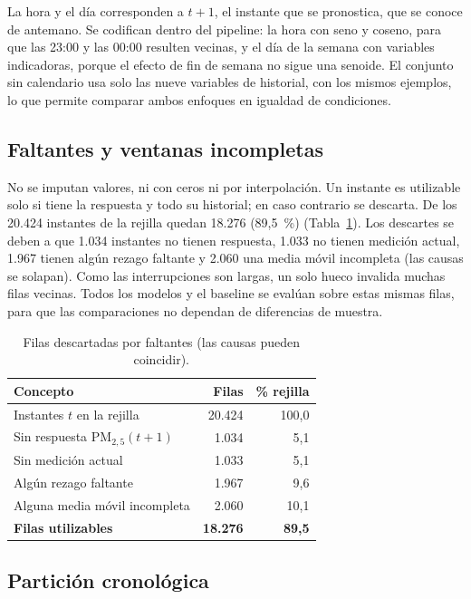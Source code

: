 La hora y el día corresponden a $t+1$, el instante que se pronostica, que se conoce de antemano. Se codifican dentro del pipeline: la hora con seno y coseno, para que las 23:00 y las 00:00 resulten vecinas, y el día de la semana con variables indicadoras, porque el efecto de fin de semana no sigue una senoide. El conjunto sin calendario usa solo las nueve variables de historial, con los mismos ejemplos, lo que permite comparar ambos enfoques en igualdad de condiciones.

\subsection{Faltantes y ventanas incompletas}

No se imputan valores, ni con ceros ni por interpolación. Un instante es utilizable solo si tiene la respuesta y todo su historial; en caso contrario se descarta. De los 20.424 instantes de la rejilla quedan 18.276 (89,5~\%) (Tabla~\ref{tab:perdida}). Los descartes se deben a que 1.034 instantes no tienen respuesta, 1.033 no tienen medición actual, 1.967 tienen algún rezago faltante y 2.060 una media móvil incompleta (las causas se solapan). Como las interrupciones son largas, un solo hueco invalida muchas filas vecinas. Todos los modelos y el baseline se evalúan sobre estas mismas filas, para que las comparaciones no dependan de diferencias de muestra.

\begin{table}[t]
\centering
\caption{Filas descartadas por faltantes (las causas pueden coincidir).}
\label{tab:perdida}
\small
\begin{tabular}{@{}lrr@{}}
\toprule
Concepto & Filas & \% rejilla \\
\midrule
Instantes $t$ en la rejilla & 20.424 & 100,0 \\
Sin respuesta $\mathrm{PM}_{2{,}5}(t+1)$ & 1.034 & 5,1 \\
Sin medición actual & 1.033 & 5,1 \\
Algún rezago faltante & 1.967 & 9,6 \\
Alguna media móvil incompleta & 2.060 & 10,1 \\
\midrule
\textbf{Filas utilizables} & \textbf{18.276} & \textbf{89,5} \\
\bottomrule
\end{tabular}
\end{table}

\subsection{Partición cronológica}

